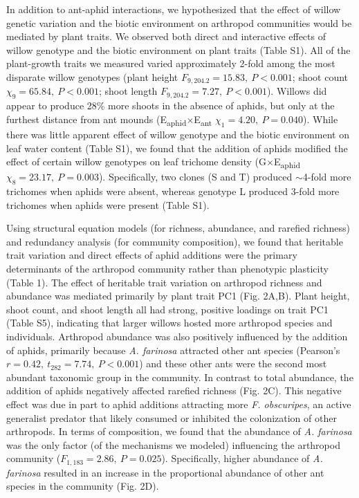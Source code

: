 \documentclass[11pt]{article}
\begin{document}
In addition to ant-aphid interactions, we hypothesized that the effect
of willow genetic variation and the biotic environment on arthropod
communities would be mediated by plant traits. We observed both direct
and interactive effects of willow genotype and the biotic environment on
plant traits (Table S1). All of the plant-growth traits we measured
varied approximately 2-fold among the most disparate willow genotypes
(plant height \(F_{9,204.2}=15.83,\ P<0.001\); shoot count \(\chi_9=65.84,\ P<0.001\); shoot
length \(F_{9,204.2}=7.27,\ P<0.001\)). Willows did appear to produce 28\% more
shoots in the absence of aphids, but only at the furthest distance from
ant mounds (E\textsubscript{aphid}$\times$E\textsubscript{ant} $\chi_1=4.20,\ P=0.040$). While there was little apparent effect
of willow genotype and the biotic environment on leaf water content
(Table S1), we found that the addition of aphids modified the effect of
certain willow genotypes on leaf trichome density (G$\times$E\textsubscript{aphid} $\chi_8=23.17,\ P=0.003$).
Specifically, two clones (S and T) produced $\sim$4-fold more
trichomes when aphids were absent, whereas genotype L produced 3-fold
more trichomes when aphids were present (Table S1).

Using structural equation models (for richness, abundance, and rarefied
richness) and redundancy analysis (for community composition), we found
that heritable trait variation and direct effects of aphid additions
were the primary determinants of the arthropod community rather than
phenotypic plasticity (Table 1). The effect of heritable trait variation
on arthropod richness and abundance was mediated primarily by plant
trait PC1 (Fig. 2A,B). Plant height, shoot count, and shoot length all
had strong, positive loadings on trait PC1 (Table S5), indicating that
larger willows hosted more arthropod species and individuals. Arthropod
abundance was also positively influenced by the addition of aphids,
primarily because \textit{A. farinosa} attracted other ant species
(Pearson's \(r=0.42,\ t_{282}=7.74,\ P<0.001\)) and these other ants were the second most
abundant taxonomic group in the community. In contrast to total
abundance, the addition of aphids negatively affected rarefied richness
(Fig. 2C). This negative effect was due in part to aphid additions
attracting more \textit{F. obscuripes}, an active generalist predator that
likely consumed or inhibited the colonization of other arthropods. In
terms of composition, we found that the abundance of \textit{A. farinosa}
was the only factor (of the mechanisms we modeled) influencing the
arthropod community (\(F_{1,183}=2.86,\ P=0.025\)). Specifically, higher abundance
of \textit{A. farinosa} resulted in an increase in the proportional
abundance of other ant species in the community (Fig. 2D).
\end{document}
